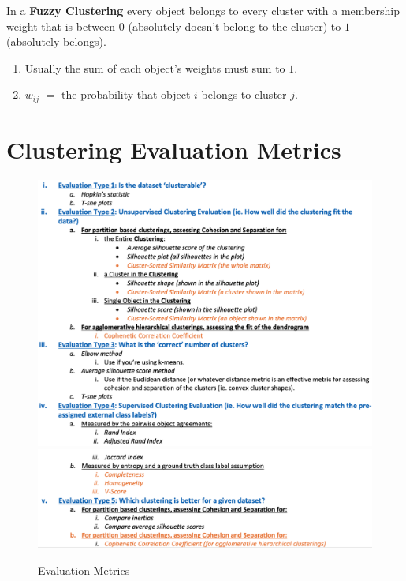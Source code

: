 \documentclass[11pt]{elegantbook}
\begin{document}
\begin{definition}
    In a \textbf{Fuzzy Clustering} every object belongs to every cluster with a membership weight that is between $0$ (absolutely doesn't belong to the cluster) to $1$ (absolutely belongs).
    \begin{enumerate}
        \item Usually the sum of each object's weights must sum to $1$.
        \item $w_{ij}$ $=$ the probability that object $i$ belongs to cluster $j$.
    \end{enumerate}
\end{definition}








\chapter{Clustering Evaluation Metrics}
\begin{center}\begin{figure}[htbp]
    \centering
    \includegraphics[scale=0.23]{metric1.png}
    \includegraphics[scale=0.23]{metric2.png}
    \caption{Evaluation Metrics}
    \label{}
\end{figure}\end{center}
\end{document}
